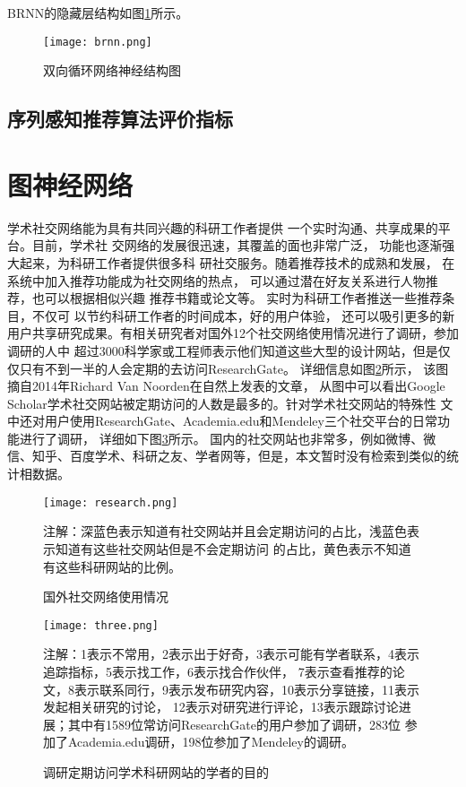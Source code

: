 BRNN的隐藏层结构如图\ref{fig:brnn}所示。
\begin{figure}[htb]
  \centering
  \texttt{[image: brnn.png]}\\
  \caption{双向循环网络神经结构图}
  \label{fig:brnn}
\end{figure}



\subsection{序列感知推荐算法评价指标}



\section{图神经网络}
学术社交网络能为具有共同兴趣的科研工作者提供%
一个实时沟通、共享成果的平台。目前，学术社%
交网络的发展很迅速，其覆盖的面也非常广泛，%
功能也逐渐强大起来，为科研工作者提供很多科%
研社交服务。随着推荐技术的成熟和发展，%
在系统中加入推荐功能成为社交网络的热点，%
可以通过潜在好友关系进行人物推荐，也可以根据相似兴趣%
推荐书籍或论文等。
实时为科研工作者推送一些推荐条目，不仅可%
以节约科研工作者的时间成本，好的用户体验，%
还可以吸引更多的新用户共享研究成果。有相关研究者对国外12个社交网络使用情况进行了调研，参加调研的人中%
超过3000科学家或工程师表示他们知道这些大型的设计网站，但是仅仅只有不到一半的人会定期的去访问ResearchGate。%
详细信息如图\ref{fig:research}所示，%
该图摘自2014年Richard Van Noorden在自然上发表的文章，
从图中可以看出Google Scholar学术社交网站被定期访问的人数是最多的。针对学术社交网站的特殊性%
文中还对用户使用ResearchGate、Academia.edu和Mendeley三个社交平台的日常功能进行了调研，%
详细如下图\ref{fig:three}所示。
国内的社交网站也非常多，例如微博、微信、知乎、百度学术、科研之友、学者网等，但是，本文暂时没有检索到类似的统计相数据。
\begin{figure}[htbp] %
  \centering
  \texttt{[image: research.png]}
  \caption{国外社交网络使用情况}
  \label{fig:research}
  \footnotesize
  注解：深蓝色表示知道有社交网站并且会定期访问的占比，浅蓝色表示知道有这些社交网站但是不会定期访问%
  的占比，黄色表示不知道有这些科研网站的比例。
\end{figure}
\begin{figure}[htbp] %
  \centering
  \texttt{[image: three.png]}
  \caption{调研定期访问学术科研网站的学者的目的}
  \label{fig:three}
  \footnotesize
  注解：1表示不常用，2表示出于好奇，3表示可能有学者联系，4表示追踪指标，5表示找工作，6表示找合作伙伴，%
  7表示查看推荐的论文，8表示联系同行，9表示发布研究内容，10表示分享链接，11表示发起相关研究的讨论，%
  12表示对研究进行评论，13表示跟踪讨论进展；其中有1589位常访问ResearchGate的用户参加了调研，283位%
  参加了Academia.edu调研，198位参加了Mendeley的调研。
\end{figure}


